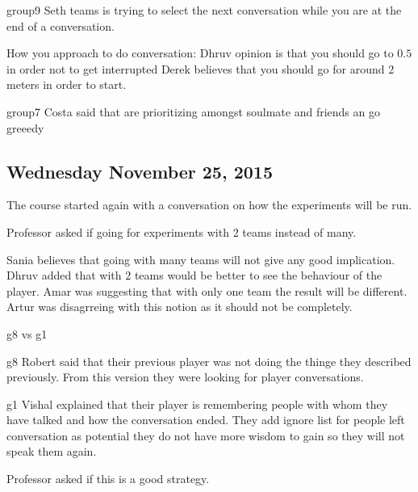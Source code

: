 group9
Seth teams is trying to select the next conversation while you are at the end of a conversation.

How you approach to do conversation:
Dhruv opinion is that you should go to $0.5$ in order not to get interrupted 
Derek believes that you should go for around 2 meters in order to start.

group7
Costa said that are prioritizing amongst soulmate and friends an go greeedy
\subsection{Wednesday November 25, 2015}
The course started again with a conversation on how the experiments will be run.
 

Professor asked if going for experiments with 2 teams instead of many.
 

Sania believes that going with many teams will not give any good implication.
Dhruv added that with 2 teams would be better to see the behaviour of the player.
Amar was suggesting that with only one team the result will be different.
Artur was disagrreing with this notion as it should not be completely.

g8 vs g1

g8
Robert said that their previous player was not doing the thinge they described previously. From this version they were looking for player conversations.

g1
Vishal explained that their player is remembering people with whom they have talked and how the conversation ended. They add ignore list for people left conversation as potential they do not have more wisdom to gain so they will not speak them again.

Professor asked if this is a good strategy.

